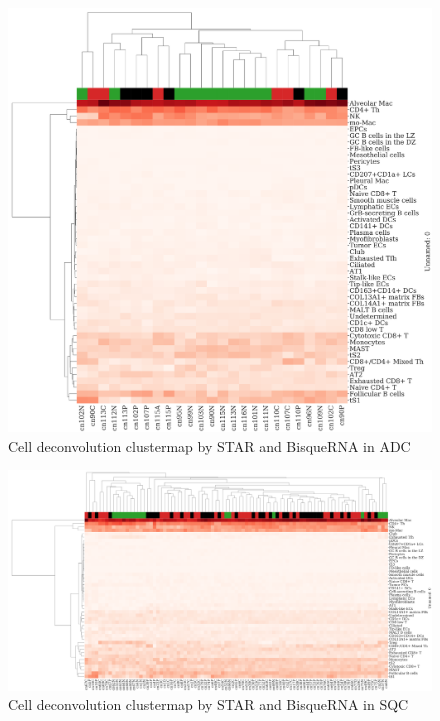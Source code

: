 \documentclass[a4paper]{article}
\begin{document}
                \begin{figure}[htbp]
                    \centering
                    \includegraphics[width=0.6 \linewidth]{figures/BisqueRNA/clustermap/STAR.ADC.cluster.pdf}
                    \caption{Cell deconvolution clustermap by STAR and BisqueRNA in ADC}
                    \label{fig:Deconvolution-BisqueRNA-STAR-cluster-ADC}
                \end{figure}

                \begin{figure}[htbp]
                    \centering
                    \includegraphics[width=\linewidth]{figures/BisqueRNA/clustermap/STAR.SQC.cluster.pdf}
                    \caption{Cell deconvolution clustermap by STAR and BisqueRNA in SQC}
                    \label{fig:Deconvolution-BisqueRNA-STAR-cluster-SQC}
                \end{figure}
\end{document}
